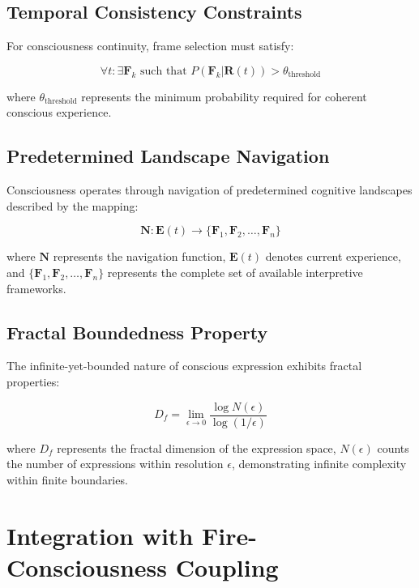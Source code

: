 \documentclass[12pt,a4paper]{article}
\begin{document}
\subsection{Temporal Consistency Constraints}

For consciousness continuity, frame selection must satisfy:

\begin{equation}
\forall t: \exists \mathbf{F}_k \text{ such that } P(\mathbf{F}_k | \mathbf{R}(t)) > \theta_{\text{threshold}}
\end{equation}

where $\theta_{\text{threshold}}$ represents the minimum probability required for coherent conscious experience.

\subsection{Predetermined Landscape Navigation}

Consciousness operates through navigation of predetermined cognitive landscapes described by the mapping:

\begin{equation}
\mathbf{N}: \mathbf{E}(t) \rightarrow \{\mathbf{F}_1, \mathbf{F}_2, \ldots, \mathbf{F}_n\}
\end{equation}

where $\mathbf{N}$ represents the navigation function, $\mathbf{E}(t)$ denotes current experience, and $\{\mathbf{F}_1, \mathbf{F}_2, \ldots, \mathbf{F}_n\}$ represents the complete set of available interpretive frameworks.

\subsection{Fractal Boundedness Property}

The infinite-yet-bounded nature of conscious expression exhibits fractal properties:

\begin{equation}
D_f = \lim_{\epsilon \to 0} \frac{\log N(\epsilon)}{\log(1/\epsilon)}
\end{equation}

where $D_f$ represents the fractal dimension of the expression space, $N(\epsilon)$ counts the number of expressions within resolution $\epsilon$, demonstrating infinite complexity within finite boundaries.

\section{Integration with Fire-Consciousness Coupling}
\end{document}
